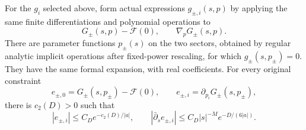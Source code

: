 \begin{proposition}
\label{arr:regular-implicit}
For the \(g_i\) selected above, form actual expressions
\(g_{\pm,i}(s,p)\) by applying the same finite differentiations
and polynomial operations to
\[
 G_\pm(s,p)-\mathcal F(0),\qquad \nabla_pG_\pm(s,p).
\]
There are parameter functions \(p_\pm(s)\) on the two
sectors, obtained by regular analytic implicit operations
after fixed-power rescaling, for which \(g_\pm(s,p_\pm)=0\).
They have the same formal expansion, with real coefficients.
For every original constraint
\[
 e_{\pm,0}=G_\pm(s,p_\pm)-\mathcal F(0),\qquad
 e_{\pm,i}=\partial_{p_i}G_\pm(s,p_\pm),
\]
there is \(c_2(D)>0\) such that
\begin{equation}\label{arr:initial-flatness}
 |e_{\pm,i}|\le C_D e^{-c_2(D)/|a|},\qquad
 |\bar\partial_s e_{\pm,i}|
       \le C_D|s|^{-M}e^{-D/(6|a|)}.
\end{equation}
\end{proposition}

